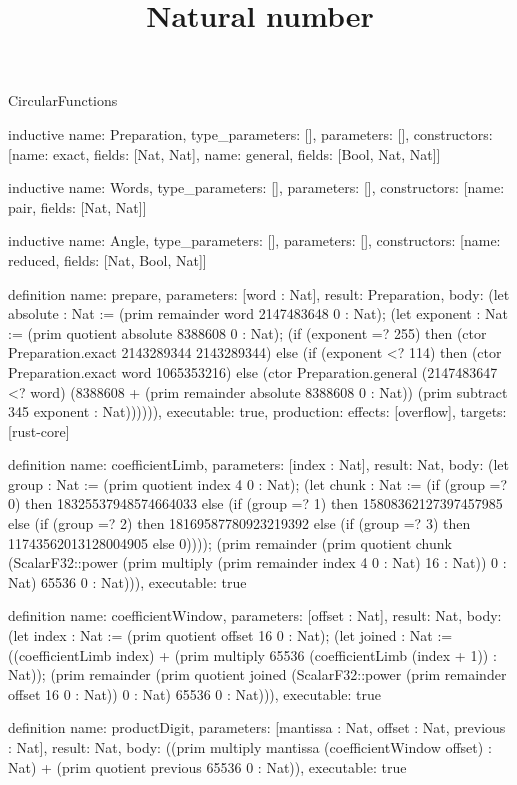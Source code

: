 \begin{lexlean}{CircularFunctions}
\title{Natural number}
\begin{semanticmodule}
inductive{
  name: Preparation,
  type_parameters: [],
  parameters: [],
  constructors: [{name: exact, fields: [Nat, Nat]}, {name: general, fields: [Bool, Nat, Nat]}]
}

inductive{
  name: Words,
  type_parameters: [],
  parameters: [],
  constructors: [{name: pair, fields: [Nat, Nat]}]
}

inductive{
  name: Angle,
  type_parameters: [],
  parameters: [],
  constructors: [{name: reduced, fields: [Nat, Bool, Nat]}]
}

definition{
  name: prepare,
  parameters: [word : Nat],
  result: Preparation,
  body: (let absolute : Nat := (prim remainder word 2147483648 0 : Nat); (let exponent : Nat := (prim quotient absolute 8388608 0 : Nat); (if (exponent =? 255) then (ctor Preparation.exact 2143289344 2143289344) else (if (exponent <? 114) then (ctor Preparation.exact word 1065353216) else (ctor Preparation.general (2147483647 <? word) (8388608 + (prim remainder absolute 8388608 0 : Nat)) (prim subtract 345 exponent : Nat)))))),
  executable: true,
  production: {effects: [overflow], targets: [rust-core]}
}

definition{
  name: coefficientLimb,
  parameters: [index : Nat],
  result: Nat,
  body: (let group : Nat := (prim quotient index 4 0 : Nat); (let chunk : Nat := (if (group =? 0) then 18325537948574664033 else (if (group =? 1) then 15808362127397457985 else (if (group =? 2) then 18169587780923219392 else (if (group =? 3) then 11743562013128004905 else 0)))); (prim remainder (prim quotient chunk (ScalarF32::power (prim multiply (prim remainder index 4 0 : Nat) 16 : Nat)) 0 : Nat) 65536 0 : Nat))),
  executable: true
}

definition{
  name: coefficientWindow,
  parameters: [offset : Nat],
  result: Nat,
  body: (let index : Nat := (prim quotient offset 16 0 : Nat); (let joined : Nat := ((coefficientLimb index) + (prim multiply 65536 (coefficientLimb (index + 1)) : Nat)); (prim remainder (prim quotient joined (ScalarF32::power (prim remainder offset 16 0 : Nat)) 0 : Nat) 65536 0 : Nat))),
  executable: true
}

definition{
  name: productDigit,
  parameters: [mantissa : Nat, offset : Nat, previous : Nat],
  result: Nat,
  body: ((prim multiply mantissa (coefficientWindow offset) : Nat) + (prim quotient previous 65536 0 : Nat)),
  executable: true
}


\end{semanticmodule}
\end{lexlean}
